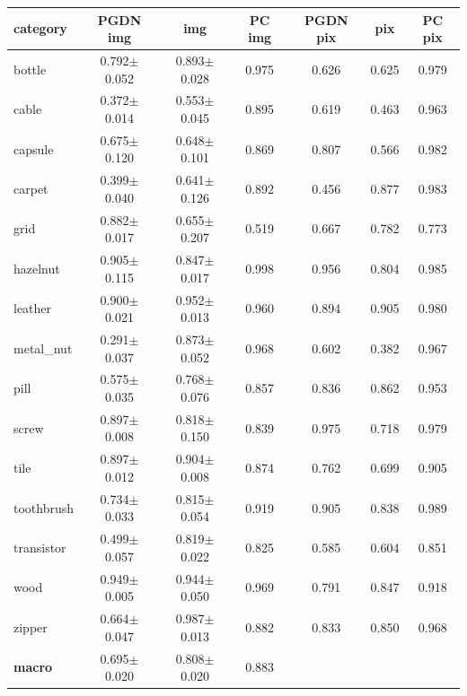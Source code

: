 \setlength{\tabcolsep}{3pt}
\begin{tabular}{@{}lcccccc@{}}
\toprule
category & PGDN img & \draem{} img & PC img & PGDN pix & \draem{} pix & PC pix \\
\midrule
bottle & 0.792$\pm$0.052 & 0.893$\pm$0.028 & 0.975 & 0.626 & 0.625 & 0.979 \\
cable & 0.372$\pm$0.014 & 0.553$\pm$0.045 & 0.895 & 0.619 & 0.463 & 0.963 \\
capsule & 0.675$\pm$0.120 & 0.648$\pm$0.101 & 0.869 & 0.807 & 0.566 & 0.982 \\
carpet & 0.399$\pm$0.040 & 0.641$\pm$0.126 & 0.892 & 0.456 & 0.877 & 0.983 \\
grid & 0.882$\pm$0.017 & 0.655$\pm$0.207 & 0.519 & 0.667 & 0.782 & 0.773 \\
hazelnut & 0.905$\pm$0.115 & 0.847$\pm$0.017 & 0.998 & 0.956 & 0.804 & 0.985 \\
leather & 0.900$\pm$0.021 & 0.952$\pm$0.013 & 0.960 & 0.894 & 0.905 & 0.980 \\
metal\_nut & 0.291$\pm$0.037 & 0.873$\pm$0.052 & 0.968 & 0.602 & 0.382 & 0.967 \\
pill & 0.575$\pm$0.035 & 0.768$\pm$0.076 & 0.857 & 0.836 & 0.862 & 0.953 \\
screw & 0.897$\pm$0.008 & 0.818$\pm$0.150 & 0.839 & 0.975 & 0.718 & 0.979 \\
tile & 0.897$\pm$0.012 & 0.904$\pm$0.008 & 0.874 & 0.762 & 0.699 & 0.905 \\
toothbrush & 0.734$\pm$0.033 & 0.815$\pm$0.054 & 0.919 & 0.905 & 0.838 & 0.989 \\
transistor & 0.499$\pm$0.057 & 0.819$\pm$0.022 & 0.825 & 0.585 & 0.604 & 0.851 \\
wood & 0.949$\pm$0.005 & 0.944$\pm$0.050 & 0.969 & 0.791 & 0.847 & 0.918 \\
zipper & 0.664$\pm$0.047 & 0.987$\pm$0.013 & 0.882 & 0.833 & 0.850 & 0.968 \\
\textbf{macro} & 0.695$\pm$0.020 & 0.808$\pm$0.020 & 0.883 &  &  &  \\
\bottomrule
\end{tabular}
